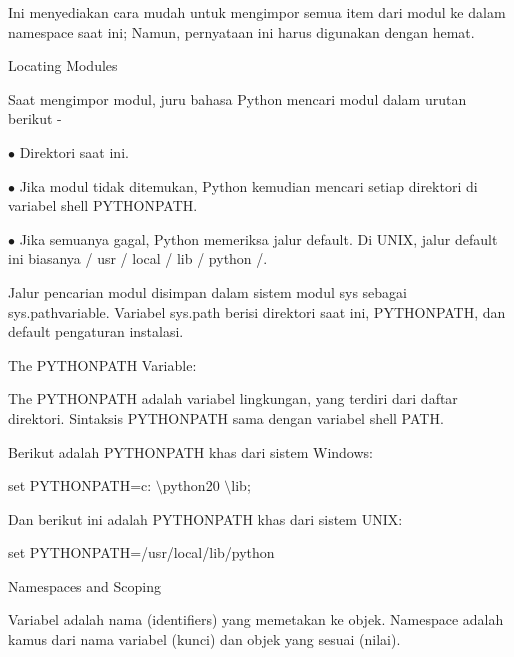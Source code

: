 \noindent 
Ini menyediakan cara mudah untuk mengimpor semua item dari modul ke dalam namespace saat ini; Namun, pernyataan ini harus digunakan dengan hemat. \par
\vspace{12pt}
\noindent 
Locating Modules \par
\noindent 
Saat mengimpor modul, juru bahasa Python mencari modul dalam urutan berikut - \par
\noindent 
 \hspace*{0.5in}  $ \bullet $ Direktori saat ini. \par
\noindent 
 \hspace*{0.5in}  $ \bullet $ Jika modul tidak ditemukan, Python kemudian mencari setiap direktori di variabel shell  \hspace*{0.5in} PYTHONPATH. \par
\noindent 
 \hspace*{0.5in}  $ \bullet $ Jika semuanya gagal, Python memeriksa jalur default. Di UNIX, jalur default ini  \hspace*{0.5in} biasanya / usr / local / lib / python /. \par
\vspace{12pt}
\noindent 
Jalur pencarian modul disimpan dalam sistem modul sys sebagai sys.pathvariable. Variabel sys.path berisi direktori saat ini, PYTHONPATH, dan default pengaturan instalasi. \par
\vspace{12pt}
\noindent 
The $  $PYTHONPATH $  $Variable: \par
\noindent 
The PYTHONPATH adalah variabel lingkungan, yang terdiri dari daftar direktori. Sintaksis PYTHONPATH sama dengan variabel shell PATH. \par
\noindent 
Berikut adalah PYTHONPATH khas dari sistem Windows: \par
\noindent 
 \hspace*{0.5in} set PYTHONPATH=c: $  \setminus  $python20 $  \setminus  $lib; \par
\noindent 
Dan berikut ini adalah PYTHONPATH khas dari sistem UNIX: \par
\noindent 
 \hspace*{0.5in} set PYTHONPATH=/usr/local/lib/python \par
\vspace{12pt}
\noindent 
Namespaces and Scoping \par
\noindent 
Variabel adalah nama (identifiers) yang memetakan ke objek. Namespace adalah kamus dari nama variabel (kunci) dan objek yang sesuai (nilai). \par
